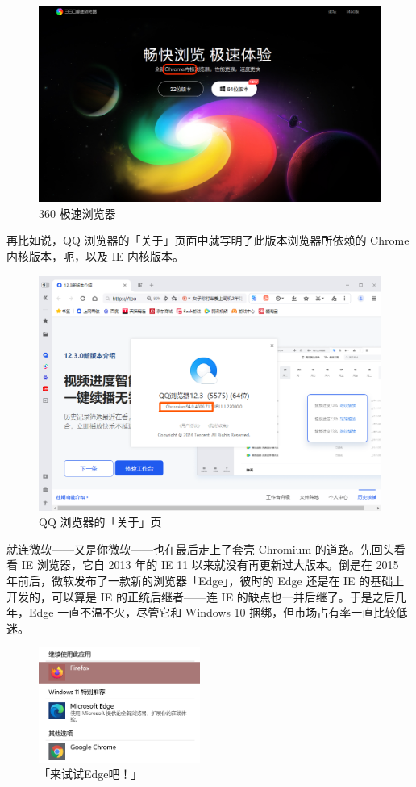 \begin{figure}[htb!]
  \centering
  \includegraphics[width=.9\textwidth]{assets/software/360_ee.png}
  \caption{360 极速浏览器}
  \label{fig:360_ee}
\end{figure}

再比如说，QQ 浏览器的「关于」页面中就写明了此版本浏览器所依赖的 Chrome 内核版本，呃，以及 IE 内核版本。

\begin{figure}[htb!]
  \centering
  \includegraphics[width=.6\textwidth]{assets/software/QQ_Browser.png}
  \caption{QQ 浏览器的「关于」页}
  \label{fig:QQ_Browser}
\end{figure}

就连微软——又是你微软——也在最后走上了套壳 Chromium 的道路。先回头看看 IE 浏览器，它自 2013 年的 IE 11 以来就没有再更新过大版本。倒是在 2015 年前后，微软发布了一款新的浏览器「Edge」，彼时的 Edge 还是在 IE 的基础上开发的，可以算是 IE 的正统后继者——连 IE 的缺点也一并后继了。于是之后几年，Edge 一直不温不火，尽管它和 Windows 10 捆绑，但市场占有率一直比较低迷。

\begin{figure}
  \centering
  \includegraphics[width=5.3cm]{assets/software/Windows_11_suggesting_Edge.png}
  \caption{「来试试Edge吧！」}
  \label{fig:Windows_11_suggesting_Edge}
\end{figure}

